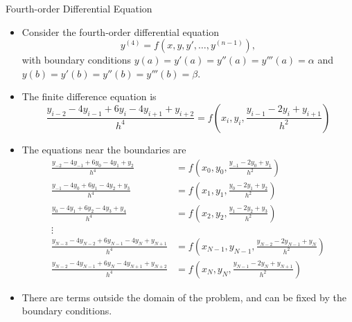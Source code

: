 \documentclass{beamer}
\newcommand{\beforeverb}{\footnotesize}
\newcommand{\afterverb}{\normalsize}
\begin{document}
\begin{frame}{Fourth-order Differential Equation}
    \begin{itemize}
        \item Consider the fourth-order differential equation 
        \[
        y^{(4)} = f(x, y, y', \ldots, y^{(n-1)}),  
        \]
        with boundary conditions $y(a)=y'(a)=y''(a)=y'''(a)=\alpha$ and $y(b)=y'(b)=y''(b)=y'''(b)=\beta$.
        \item The finite difference equation is
        \[
            \frac{y_{i-2}-4 y_{i-1}+6 y_i-4 y_{i+1}+y_{i+2}}{h^4}=f\left(x_i, y_i, \frac{y_{i-1}-2 y_i+y_{i+1}}{h^2}\right)
        \]

    \end{itemize}
\end{frame}

\begin{frame}
    \begin{itemize}
        \item The  equations near the boundaries are
        \beforeverb
        \begin{align*}
        \frac{y_{-2}-4y_{-1}+6y_0-4y_1+y_2}{h^4}&=f\left(x_0, y_0, \frac{y_{-1}-2 y_0+y_1}{h^2}\right)\\
        \frac{y_{-1}-4y_0+6y_1-4y_2+y_3}{h^4}&=f\left(x_1, y_1, \frac{y_0-2 y_1+y_2}{h^2}\right)\\
        \frac{y_{0}-4y_1+6y_2-4y_3+y_4}{h^4}&=f\left(x_2, y_2, \frac{y_1-2 y_2+y_3}{h^2}\right)\\
        \vdots\\
        \frac{y_{N-3}-4y_{N-2}+6y_{N-1}-4y_N+y_{N+1}}{h^4}&=f\left(x_{N-1}, y_{N-1}, \frac{y_{N-2}-2 y_{N-1}+y_N}{h^2}\right)\\
        \frac{y_{N-2}-4y_{N-1}+6y_N-4y_{N+1}+y_{N+2}}{h^4}&=f\left(x_N, y_N, \frac{y_{N-1}-2 y_N+y_{N+1}}{h^2}\right)
        \end{align*}
        \afterverb
        \item There are terms outside the domain of the problem, and can be fixed by the boundary conditions.
    \end{itemize}
\end{frame}
\end{document}
